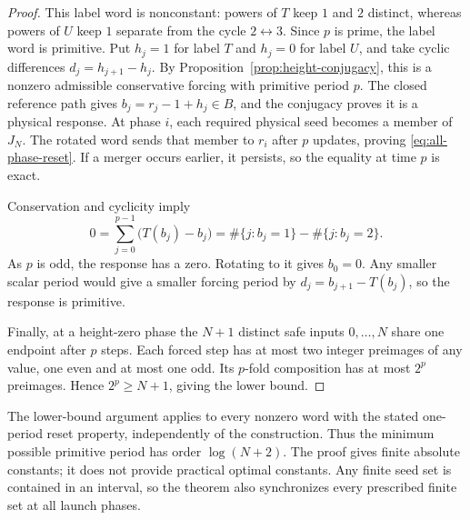 \begin{proof}
This label word is nonconstant: powers of $T$ keep $1$ and $2$
distinct, whereas powers of $U$ keep $1$ separate from the cycle
$2\leftrightarrow3$. Since $p$ is prime, the label word is
primitive. Put $h_j=1$ for label $T$ and $h_j=0$ for label $U$,
and take cyclic differences $d_j=h_{j+1}-h_j$. By
Proposition~\ref{prop:height-conjugacy}, this is a nonzero
admissible conservative forcing with primitive period $p$.
The closed reference path gives
$b_j=r_j-1+h_j\in B$, and the conjugacy proves it is a
physical response. At phase $i$, each required physical seed
becomes a member of $J_N$. The rotated word sends that member
to $r_i$ after $p$ updates, proving
\eqref{eq:all-phase-reset}. If a merger occurs earlier, it
persists, so the equality at time $p$ is exact.

Conservation and cyclicity imply
\[
 0=\sum_{j=0}^{p-1}\bigl(T(b_j)-b_j\bigr)
   =\#\{j:b_j=1\}-\#\{j:b_j=2\}.
\]
As $p$ is odd, the response has a zero. Rotating to it gives
$b_0=0$. Any smaller scalar period would give a smaller forcing
period by $d_j=b_{j+1}-T(b_j)$, so the response is primitive.

Finally, at a height-zero phase the $N+1$ distinct safe inputs
$0,\ldots,N$ share one endpoint after $p$ steps. Each forced
step has at most two integer preimages of any value, one even
and at most one odd. Its $p$-fold composition has at most $2^p$
preimages. Hence $2^p\ge N+1$, giving the lower bound.
\end{proof}

The lower-bound argument applies to every nonzero word with the
stated one-period reset property, independently of the construction.
Thus the minimum possible primitive period has order
$\log(N+2)$. The proof gives finite absolute constants; it does
not provide practical optimal constants. Any finite seed set is
contained in an interval, so the theorem also synchronizes every
prescribed finite set at all launch phases.

